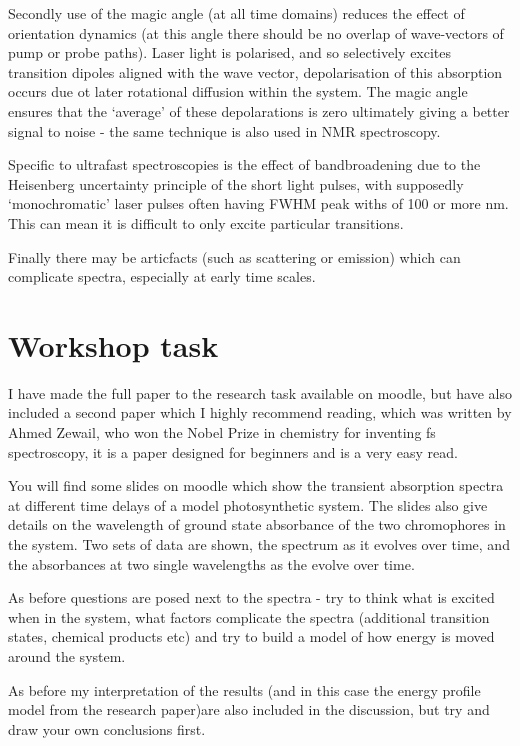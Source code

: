 \documentclass[
]{book}
\begin{document}
Secondly use of the magic angle (at all time domains) reduces the effect of orientation dynamics (at this angle there should be no overlap of wave-vectors of pump or probe paths). Laser light is polarised, and so selectively excites transition dipoles aligned with the wave vector, depolarisation of this absorption occurs due ot later rotational diffusion within the system. The magic angle ensures that the `average' of these depolarations is zero ultimately giving a better signal to noise - the same technique is also used in NMR spectroscopy.

Specific to ultrafast spectroscopies is the effect of bandbroadening due to the Heisenberg uncertainty principle of the short light pulses, with supposedly `monochromatic' laser pulses often having FWHM peak withs of 100 or more nm. This can mean it is difficult to only excite particular transitions.

Finally there may be articfacts (such as scattering or emission) which can complicate spectra, especially at early time scales.

\hypertarget{workshop-task-1}{%
\section{Workshop task}\label{workshop-task-1}}

I have made the full paper to the research task available on moodle, but have also included a second paper which I highly recommend reading, which was written by Ahmed Zewail, who won the Nobel Prize in chemistry for inventing fs spectroscopy, it is a paper designed for beginners and is a very easy read.

You will find some slides on moodle which show the transient absorption spectra at different time delays of a model photosynthetic system. The slides also give details on the wavelength of ground state absorbance of the two chromophores in the system. Two sets of data are shown, the spectrum as it evolves over time, and the absorbances at two single wavelengths as the evolve over time.

As before questions are posed next to the spectra - try to think what is excited when in the system, what factors complicate the spectra (additional transition states, chemical products etc) and try to build a model of how energy is moved around the system.

As before my interpretation of the results (and in this case the energy profile model from the research paper)are also included in the discussion, but try and draw your own conclusions first.
\end{document}
